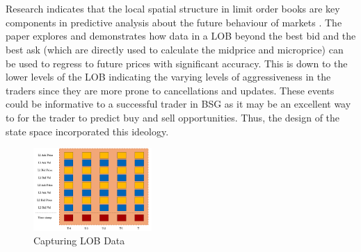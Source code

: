 \documentclass[ %
                    author={Ashwinder Khurana},
                supervisor={Prof Dave Cliff},
                    degree={MEng},
                     title={The Deeply Reinforced Trader},
                  subtitle={},
                      type={enterprise},
                      year={2020} ]{dissertation}
\begin{document}
{\\
\\
Research indicates that the local spatial structure in limit order books are key components in predictive analysis about the future behaviour of markets \cite{DeepLOB}. The paper explores and demonstrates how data in a LOB beyond the best bid and the best ask (which are directly used to calculate the midprice and microprice) can be used to regress to future prices with significant accuracy. This is down to the lower levels of the LOB indicating the varying levels of aggressiveness in the traders since they are more prone to cancellations and updates. These events could be informative to a successful trader in BSG as it may be an excellent way to for the trader to predict buy and sell opportunities. Thus, the design of the state space incorporated this ideology. 

\begin{figure}[H]
	\centering
  	\includegraphics[width=0.4\textwidth]{LOB-Snapshot.png}
 	\caption{Capturing LOB Data}
	\label{fig:LOB-Snapshot}  
\end{figure}

}
\end{document}
